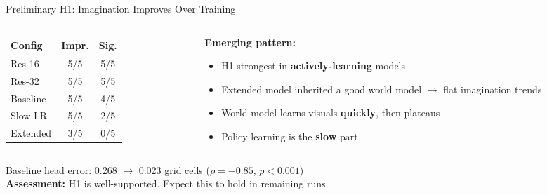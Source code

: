 \documentclass[aspectratio=169]{beamer}
\begin{document}
\begin{frame}{Preliminary H1: Imagination Improves Over Training}

\begin{columns}
\begin{column}{0.45\textwidth}
\begin{table}
\centering
\small
\begin{tabular}{lcc}
\toprule
\textbf{Config} & \textbf{Impr.} & \textbf{Sig.} \\
\midrule
Res-16      & 5/5 & 5/5 \\
Res-32      & 5/5 & 5/5 \\
Baseline    & 5/5 & 4/5 \\
Slow LR     & 5/5 & 2/5 \\
Extended    & 3/5 & 0/5 \\
\bottomrule
\end{tabular}
\end{table}
\end{column}
\begin{column}{0.52\textwidth}
\textbf{Emerging pattern:}
\begin{itemize}
    \item H1 strongest in \textbf{actively-learning} models
    \item Extended model inherited a good world model $\rightarrow$ flat imagination trends
    \item World model learns visuals \textbf{quickly}, then plateaus
    \item Policy learning is the \textbf{slow} part
\end{itemize}
\end{column}
\end{columns}

\vspace{0.5em}
Baseline head error: 0.268 $\rightarrow$ 0.023 grid cells ($\rho = -0.85$, $p < 0.001$)\\[0.3em]
\textbf{Assessment:} H1 is well-supported. Expect this to hold in remaining runs.
\end{frame}
\end{document}
